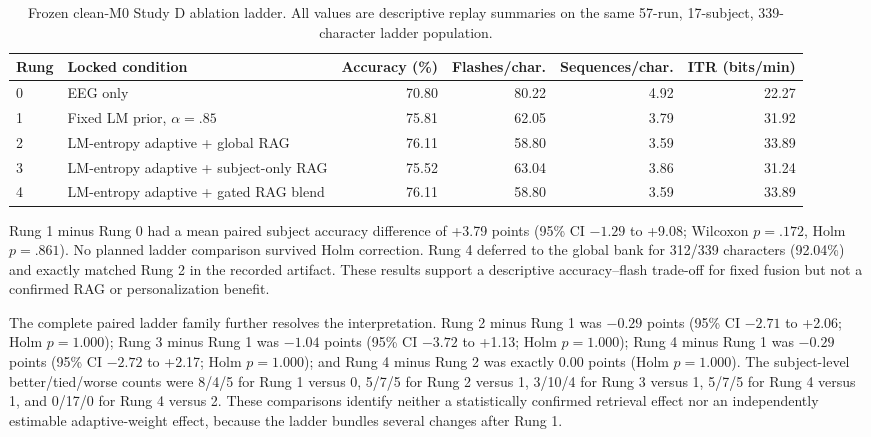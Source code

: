 \documentclass[final,5p,times,twocolumn,authoryear]{elsarticle}
\begin{document}
\begin{table}[t]
\centering\small
\caption{Frozen clean-M0 Study D ablation ladder. All values are descriptive replay summaries on the same 57-run, 17-subject, 339-character ladder population.}\label{tab:ladder}
\begin{tabular}{llrrrr}
\toprule
Rung & Locked condition & Accuracy (\%) & Flashes/char. & Sequences/char. & ITR (bits/min)\\
\midrule
0 & EEG only & 70.80 & 80.22 & 4.92 & 22.27\\
1 & Fixed LM prior, $\alpha=.85$ & 75.81 & 62.05 & 3.79 & 31.92\\
2 & LM-entropy adaptive + global RAG & 76.11 & 58.80 & 3.59 & 33.89\\
3 & LM-entropy adaptive + subject-only RAG & 75.52 & 63.04 & 3.86 & 31.24\\
4 & LM-entropy adaptive + gated RAG blend & 76.11 & 58.80 & 3.59 & 33.89\\
\bottomrule
\end{tabular}
\end{table}

Rung 1 minus Rung 0 had a mean paired subject accuracy difference of +3.79 points (95\% CI $-1.29$ to +9.08; Wilcoxon $p=.172$, Holm $p=.861$). No planned ladder comparison survived Holm correction. Rung 4 deferred to the global bank for 312/339 characters (92.04\%) and exactly matched Rung 2 in the recorded artifact. These results support a descriptive accuracy--flash trade-off for fixed fusion but not a confirmed RAG or personalization benefit.

The complete paired ladder family further resolves the interpretation. Rung 2 minus Rung 1 was $-0.29$ points (95\% CI $-2.71$ to +2.06; Holm $p=1.000$); Rung 3 minus Rung 1 was $-1.04$ points (95\% CI $-3.72$ to +1.13; Holm $p=1.000$); Rung 4 minus Rung 1 was $-0.29$ points (95\% CI $-2.72$ to +2.17; Holm $p=1.000$); and Rung 4 minus Rung 2 was exactly 0.00 points (Holm $p=1.000$). The subject-level better/tied/worse counts were 8/4/5 for Rung 1 versus 0, 5/7/5 for Rung 2 versus 1, 3/10/4 for Rung 3 versus 1, 5/7/5 for Rung 4 versus 1, and 0/17/0 for Rung 4 versus 2. These comparisons identify neither a statistically confirmed retrieval effect nor an independently estimable adaptive-weight effect, because the ladder bundles several changes after Rung 1.
\end{document}
